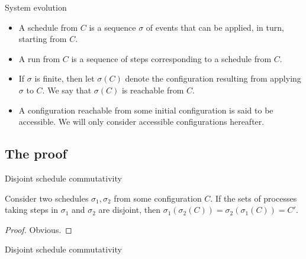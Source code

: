 \documentclass{beamer}
\begin{document}
\begin{frame}{System evolution}
  \begin{itemize}
    \item A \alert{schedule} from $C$ is a sequence $\sigma$ of events that can be applied, in turn, starting from $C$.
    \item A \alert{run} from $C$ is a sequence of steps corresponding to a schedule from $C$.
    \item If $\sigma$ is finite, then let $\sigma(C)$ denote the configuration resulting from applying $\sigma$ to $C$. We say that $\sigma(C)$ is \alert{reachable} from $C$.
    \item A configuration reachable from some initial configuration is said to be \alert{accessible}. We will only consider accessible configurations hereafter.
  \end{itemize}
\end{frame}

\subsection{The proof}
\begin{frame}{Disjoint schedule commutativity}
  \begin{lemma}
    Consider two schedules $\sigma_1, \sigma_2$ from some configuration $C$. If the sets of processes taking steps in $\sigma_1$ and $\sigma_2$ are disjoint, then $\sigma_1(\sigma_2(C)) = \sigma_2(\sigma_1(C)) = C'$.
  \end{lemma}
  \begin{proof}
    Obvious.
  \end{proof}
\end{frame}

\begin{frame}{Disjoint schedule commutativity}
  \begin{figure}[!h]
  \centering
  \end{figure}
\end{frame}
\end{document}
